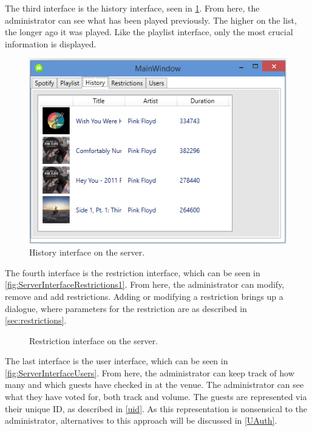The third interface is the history interface, seen in \cref{fig:ServerInterfaceHistory}. From here, the administrator can see what has been played previously. The higher on the list, the longer ago it was played. Like the playlist interface, only the most crucial information is displayed. 

\begin{figure}[hbtp]
  \centering
  \includegraphics[width=\textwidth]{Images/ServerInterfaceHistory.png}
  \caption{History interface on the server.}\label{fig:ServerInterfaceHistory}
\end{figure}

The fourth interface is the restriction interface, which can be seen in \cref{fig:ServerInterfaceRestrictions1}. From here, the administrator can modify, remove and add restrictions. Adding or modifying a restriction brings up a dialogue, where parameters for the restriction are as described in \cref{sec:restrictions}.

\begin{figure}[H]
  \centering
  \caption{Restriction interface on the server.}
\end{figure}

The last interface is the user interface, which can be seen in \cref{fig:ServerInterfaceUsers}. From here, the administrator can keep track of how many and which guests have checked in at the venue. The administrator can see what they have voted for, both track and volume. The guests are represented via their unique ID, as described in \cref{uid}. As this representation is nonsensical to the administrator, alternatives to this approach will be discussed in \cref{UAuth}.


